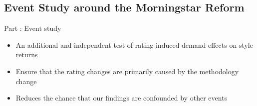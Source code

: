 \documentclass[UTF8, 16pt]{beamer}
\begin{document}
\begin{CJK*}{UTF8}{gbsn}
\subsection{Event Study around the Morningstar Reform}

\begin{frame}{Part \uppercase\expandafter{}: Event study}
	\begin{itemize}
		\item An additional and independent test of rating-induced demand effects on style returns
		\item Ensure that the rating changes are \alert{primarily caused by the methodology change}
		\item Reduces the chance that our findings are confounded by \alert{other events}
	\end{itemize}
\end{frame}


\end{CJK*}
\end{document}
